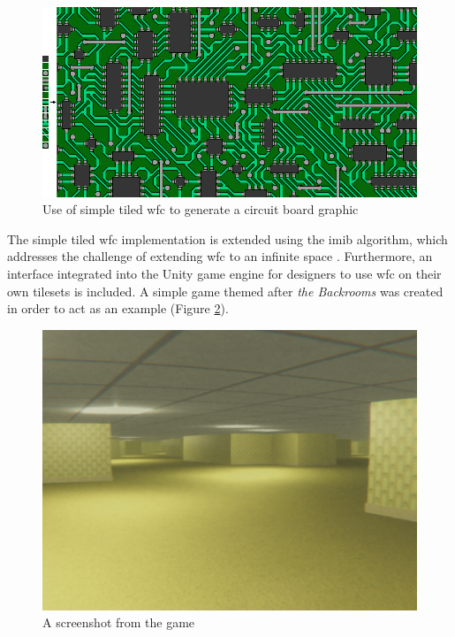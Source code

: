 \begin{figure}[H]
    \centering
    \includegraphics[width=\textwidth, height=0.3\textheight, keepaspectratio]{Images/circuit-1.png}
    \caption{Use of simple tiled \acrshort{wfc} to generate a circuit board graphic \cite{Gumin_Wave_Function_Collapse_2016}}
    \label{fig:WFCcircuit}
\end{figure}

The simple tiled \acrshort{wfc} implementation is extended using the \acrfull{imib} algorithm, which addresses the challenge of extending \acrshort{wfc} to an infinite space \cite{Infinite_Modifying_In_Blocks}. Furthermore, an interface integrated into the Unity game engine for designers to use \acrshort{wfc} on their own tilesets is included. A simple game themed after \textit{the Backrooms} was created in order to act as an example (Figure \ref{fig:backroomsInGame}).

\begin{figure}[H]
    \centering
    \includegraphics[width=\textwidth, height=0.4\textheight, keepaspectratio]{Images/Backrooms.png}
    \caption{A screenshot from the game}
    \label{fig:backroomsInGame}
\end{figure}


